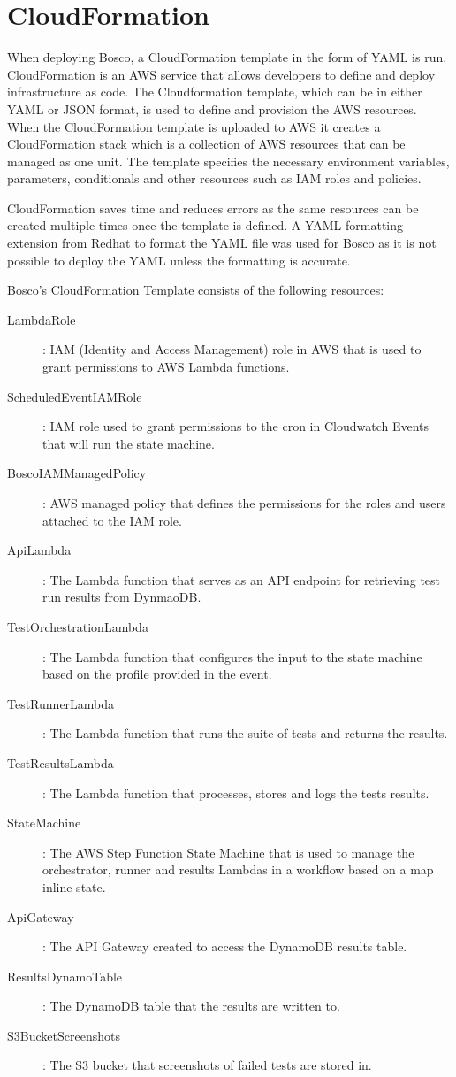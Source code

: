 \documentclass[12pt,a4paper,titlepage]{report}
\begin{document}
\section{CloudFormation}
When deploying Bosco, a  CloudFormation template in the form of YAML is run.  CloudFormation is an AWS service that allows developers to define and deploy infrastructure as code.
The Cloudformation template, which can be in either YAML or JSON format, is used to define and provision the AWS resources. When the CloudFormation template is uploaded to AWS it 
creates a CloudFormation stack which is a collection of AWS resources that can be managed as one unit. 
The template specifies the necessary environment variables, parameters, conditionals and other resources such as IAM roles and policies. 

CloudFormation saves time and reduces errors as the same resources can be created multiple times once the template is defined.
A YAML formatting extension from Redhat to format the YAML file was used for Bosco as it is not possible to deploy the YAML unless the formatting is accurate.

Bosco's CloudFormation Template consists of the following resources:

\begin{description}
  \item [LambdaRole]: IAM (Identity and Access Management) role in AWS that is used to grant permissions to AWS Lambda functions.
  \item [ScheduledEventIAMRole]: IAM role used to grant permissions to the cron in Cloudwatch Events that will run the state machine.
  \item [BoscoIAMManagedPolicy]: AWS managed policy that defines the permissions for the roles and users attached to the IAM role.
  \item [ApiLambda]: The Lambda function that serves as an API endpoint for retrieving test run results from DynmaoDB.
  \item [TestOrchestrationLambda]: The Lambda function that configures the input to the state machine based on the profile provided in the event.
  \item [TestRunnerLambda]: The Lambda function that runs the suite of tests and returns the results.
  \item [TestResultsLambda]: The Lambda function that processes, stores and logs the tests results.
  \item [StateMachine]: The AWS Step Function State Machine that is used to manage the orchestrator, runner and results Lambdas in a workflow based on a map inline state. 
  \item [ApiGateway]: The API Gateway created to access the DynamoDB results table.
  \item [ResultsDynamoTable]: The DynamoDB table that the results are written to.
  \item [S3BucketScreenshots]: The S3 bucket that screenshots of failed tests are stored in.
\end{description}
\end{document}
